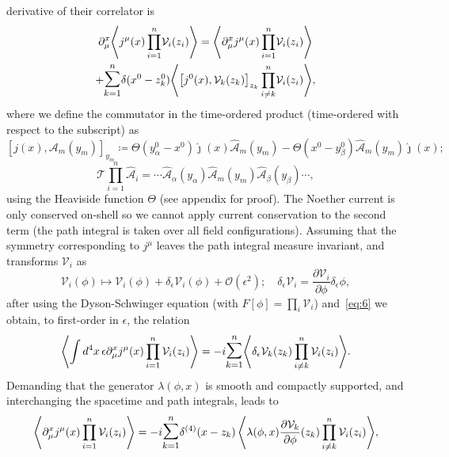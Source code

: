 \documentclass[11pt, a4paper]{article}
\begin{document}
derivative of their correlator is
\begin{multline}\label{eq:11}
  \partial^x_{\mu}\!\Braket{j^\mu(x)\prod^n_{i=1}{\!\mathcal{V}_i(z_i)}} = 
  \Braket{\partial^x_{\mu}j^\mu(x) \prod^n_{i=1}{\!\mathcal{V}_i(z_i)}} \\ + 
  \mathlarger{\mathlarger{\sum}}_{k = 1}^{n}{ \delta(x^0 - z^0_{k})
  \!\Braket{{\left[j^0(x), \mathcal{V}_k(z_k)\right]}_{z_k}\prod^n_{i\neq k}{\!\mathcal{V}_i(z_i)} } },
\end{multline}
where we define the commutator in the time-ordered product
(time-ordered with respect to the subscript) as
\begin{equation}\label{eq:12}
 {[j(x),\mathcal{A}_m(y_m) ]}_{y_m} \coloneq
  \Theta(y^0_{\alpha} - x^0)\hat{\jmath}(x)\widehat{\mathcal{A}}_m(y_m) -
  \Theta( x^0 - y^0_{\beta})\widehat{\mathcal{A}}_m(y_m)\hat{\jmath}(x);
\end{equation}
\begin{equation}
  \mathcal{T}\prod_{i=1}^n{\widehat{\mathcal{A}}_i} =
  \cdots \widehat{\mathcal{A}}_{\alpha}(y_\alpha) \widehat{\mathcal{A}}_m(y_m)
  \widehat{\mathcal{A}}_{\beta}(y_\beta) \cdots,
\end{equation}
using the Heaviside function $\Theta$ (see appendix for proof).
The Noether current is only conserved on-shell so we cannot apply
current conservation to the second term (the path integral
is taken over all field configurations). Assuming that
the symmetry corresponding to $j^\mu$ leaves the path integral
measure invariant, and transforms $\mathcal{V}_i$ as
\begin{equation}
  \mathcal{V}_i(\phi) \mapsto \mathcal{V}_i(\phi) + \delta_\epsilon\mathcal{V}_i(\phi)
  + \mathcal{O}(\epsilon^2); \quad \delta_\epsilon\mathcal{V}_i =
  \frac{\partial\mathcal{V}_i}{\partial\phi}\delta_\epsilon\phi,
\end{equation}
after using the Dyson-Schwinger equation (with $F[\phi] = \prod_i{\mathcal{V}_i}$)
and~\eqref{eq:6} we obtain, to first-order in $\epsilon$, the relation
\begin{equation}
  \Braket{\int{d^4x\,\epsilon\partial^x_\mu j^\mu(x)}\prod^n_{i=1}{\mathcal{V}_i(z_i)}} =
  -i\mathlarger{\mathlarger{\sum}}_{k =1}^n{\Braket{\delta_\epsilon\mathcal{V}_k(z_k)
  \prod_{i \neq k}^n{\mathcal{V}_i(z_i)}}}.
\end{equation}
Demanding that the generator $\lambda(\phi, x)$ is smooth and compactly
supported, and interchanging the spacetime and path integrals,
leads to
\begin{equation}
  \Braket{ \partial^x_\mu j^\mu(x)\prod^n_{i=1}{\mathcal{V}_i(z_i)} } = 
  -i\mathlarger{\mathlarger{\sum}}_{k=1}^n{\delta^{(4)}(x - z_k)
    \Braket{ \lambda(\phi, x)\frac{\partial\mathcal{V}_k}{\partial\phi}(z_k)
  \prod_{i \neq k}^n{\mathcal{V}_i(z_i)}} },
\end{equation}
\end{document}
